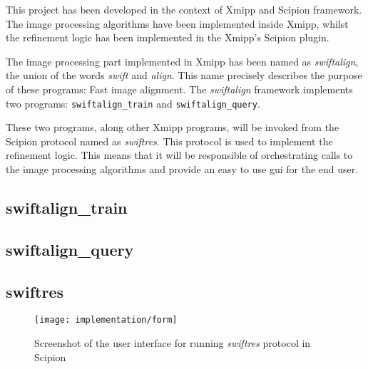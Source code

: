 \documentclass[../main.tex]{subfiles}
\begin{document}
This project has been developed in the context of Xmipp and Scipion framework. The image processing algorithms have been implemented inside Xmipp, whilst the refinement logic has been implemented in the Xmipp's Scipion plugin.

The image processing part implemented in Xmipp has been named as \textit{swiftalign}, the union of the words \textit{swift} and \textit{align}. This name precisely describes the purpose of these programs: Fast image alignment. The \textit{swiftalign} framework implements two programs: \texttt{swiftalign\_train} and \texttt{swiftalign\_query}. 

These two programs, along other Xmipp programs, will be invoked from the Scipion protocol named as \textit{swiftres}. This protocol is used to implement the refinement logic. This means that it will be responsible of orchestrating calls to the image processing algorithms and provide an easy to use \gls{gui} for the end user.

\subsection{swiftalign\_train}

\subsection{swiftalign\_query}

\subsection{swiftres}

\begin{figure}[hbpt]
    \centering
    \texttt{[image: implementation/form]}
    \caption{Screenshot of the user interface for running \textit{swiftres} protocol in Scipion}
    \label{fig:my_label}
\end{figure}
\end{document}
